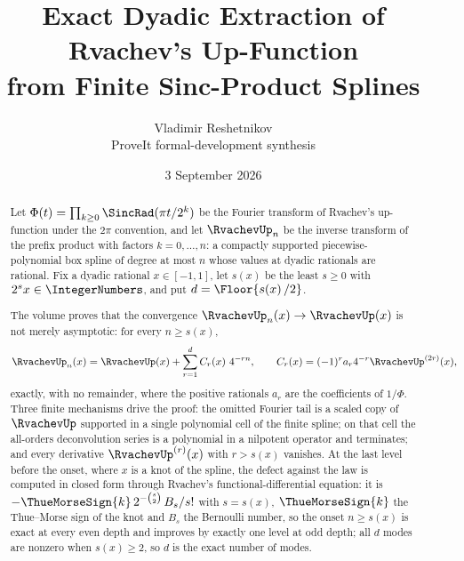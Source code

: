\documentclass[11pt,oneside]{article}
\theoremstyle{plain}
\theoremstyle{definition}
\theoremstyle{remark}
\newcommand{\upn}[1]{\RvachevUp_{#1}}
\newcommand{\PhiUp}{\Phi}                                   %
\newcommand{\dep}[1]{s\!\left(#1\right)}                    %
\newcommand{\am}[1]{a_{#1}}                                 %
\newcommand{\Cr}[2]{C_{#1}\!\left(#2\right)}                %
\begin{document}
\title{\textbf{Exact Dyadic Extraction of Rvachev's Up-Function}\\[0.35em]
  \Large from Finite Sinc-Product Splines}
\author{Vladimir Reshetnikov\\
  \small ProveIt formal-development synthesis}
\date{3 September 2026}

\maketitle

\begin{abstract}
Let \(\PhiUp(t)=\prod_{k\ge0}\SincRad(\pi t/2^{k})\) be the Fourier transform of
Rvachev's up-function under the \(2\pi\) convention, and let \(\upn{n}\) be the
inverse transform of the prefix product with factors \(k=0,\ldots,n\): a
compactly supported piecewise-polynomial box spline of degree at most \(n\)
whose values at dyadic rationals are rational.  Fix a dyadic rational
\(x\in[-1,1]\), let \(\dep{x}\) be the least \(s\ge0\) with \(2^{s}x\in
\IntegerNumbers\), and put \(d=\Floor{\dep{x}/2}\).

The volume proves that the convergence \(\upn{n}(x)\to\RvachevUp(x)\) is not
merely asymptotic: for every \(n\ge\dep{x}\),
\[
 \upn{n}(x)=\RvachevUp(x)+\sum_{r=1}^{d}\Cr{r}{x}\,4^{-rn},
 \qquad
 \Cr{r}{x}=(-1)^{r}\am{r}4^{-r}\RvachevUp^{(2r)}(x),
\]
exactly, with no remainder, where the positive rationals \(\am{r}\) are the
coefficients of \(1/\PhiUp\).  Three finite mechanisms drive the proof: the
omitted Fourier tail is a scaled copy of \(\RvachevUp\) supported in a single
polynomial cell of the finite spline; on that cell the all-orders
deconvolution series is a polynomial in a nilpotent operator and terminates;
and every derivative \(\RvachevUp^{(r)}(x)\) with \(r>\dep{x}\) vanishes.  At
the last level before the onset, where \(x\) is a knot of the spline, the
defect against the law is computed in closed form through Rvachev's
functional-differential equation: it is \(-\ThueMorseSign{k}\,2^{-\binom{s}{2}}\,B_{s}/s!\)
with \(s=\dep{x}\), \(\ThueMorseSign{k}\) the Thue--Morse sign of the knot and
\(B_{s}\) the Bernoulli number, so the onset \(n\ge\dep{x}\) is exact at every
even depth and improves by exactly one level at odd depth; all \(d\) modes are
nonzero when \(\dep{x}\ge2\), so \(d\) is the exact number of modes.


\end{abstract}
\end{document}
